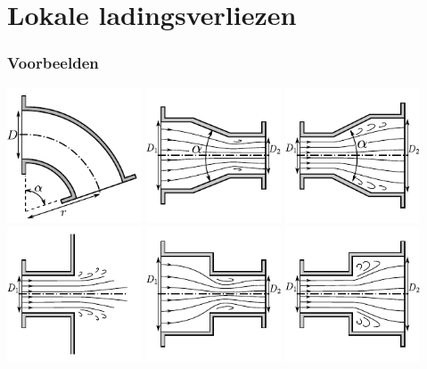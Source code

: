 \documentclass[t]{beamer}
\begin{document}
  	\section{Lokale ladingsverliezen}
  	\begin{frame}
		\frametitle{Voorbeelden}
		\center
		\includegraphics[width=0.3\textwidth]{../fig/appendix/Bocht} \quad
		\includegraphics[width=0.3\textwidth]{../fig/appendix/Gelijdelijke_vernauwing} \quad
		\includegraphics[width=0.3\textwidth]{../fig/appendix/Gelijdelijke_verwijding}
		\\
		\includegraphics[width=0.3\textwidth]{../fig/appendix/Uitstroming} \quad
		\includegraphics[width=0.3\textwidth]{../fig/appendix/Vernauwing} \quad
		\includegraphics[width=0.3\textwidth]{../fig/appendix/Verwijding}
	\end{frame}
\end{document}
